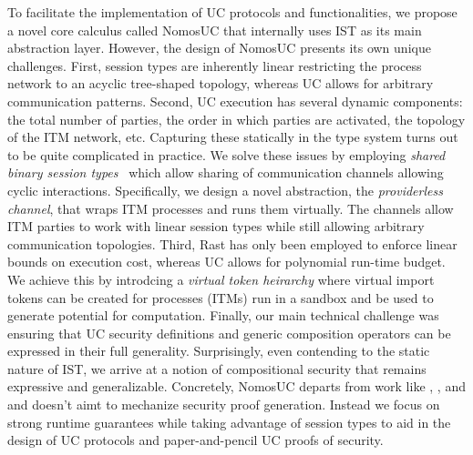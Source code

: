 To facilitate the implementation of UC protocols and functionalities, we propose a novel core calculus called NomosUC that
internally uses IST as its main abstraction layer.
However, the design of NomosUC presents its own unique challenges.
First, session types are inherently linear restricting the process network to an acyclic tree-shaped topology,
whereas UC allows for arbitrary communication patterns.
Second, UC execution has several dynamic components: the total number of parties, the order in which parties are activated,
the topology of the ITM network, etc.
Capturing these statically in the type system turns out to be quite complicated in practice.
We solve these issues by employing \emph{shared binary session types}~\cite{balzer2017manifest} which allow sharing
of communication channels allowing cyclic interactions.
Specifically, we design a novel abstraction, the \emph{providerless channel}, that wraps ITM processes and runs them virtually.
The channels allow ITM parties to work with linear session types while still allowing arbitrary communication topologies.
Third, Rast has only been employed to enforce linear bounds on execution cost, whereas UC allows for polynomial run-time budget.
We achieve this by introdcing a \emph{virtual token heirarchy} where virtual import tokens can be created for processes (ITMs) run in a sandbox and be used to generate potential for computation. 
Finally, our main technical challenge was ensuring that UC security definitions and generic composition operators
can be expressed in their full generality.
Surprisingly, even contending to the static nature of IST, we arrive at a notion of compositional security that remains expressive and generalizable.
Concretely, NomosUC departs from work like \cite{easyuc}, \cite{barbossa}, and \cite{ipdl} and doesn't aimt to mechanize security proof generation.
Instead we focus on strong runtime guarantees while taking advantage of session types to aid in the design of UC protocols and paper-and-pencil UC proofs of security.

